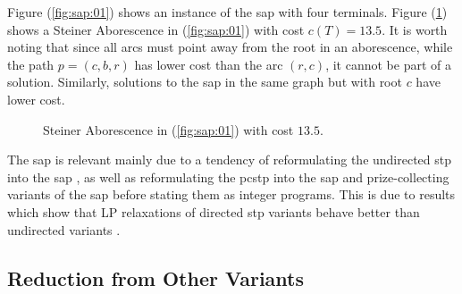 Figure (\ref{fig:sap:01}) shows an instance of the \gls{sap} with four terminals. Figure (\ref{fig:sap:01:opt}) shows a Steiner Aborescence in (\ref{fig:sap:01})
with cost $c(T) = 13.5$. It is worth noting that since all arcs must point away from the root in an aborescence, while the path $p = (c, b, r)$  has
 lower cost than the arc $(r, c)$, it cannot be part of a solution. Similarly, solutions to the \gls{sap} in the same graph but with root $c$ have lower cost.

\begin{figure}[h]\centering
{}
\caption{Steiner Aborescence in (\ref{fig:sap:01}) with cost $13.5$.}
\label{fig:sap:01:opt}
\end{figure}

The \gls{sap} is relevant mainly due to a tendency of reformulating the undirected \gls{stp} into the \gls{sap} \citep{koch1998solving}, as well as reformulating
the \gls{pcstp} into the \gls{sap} \citep{gamrath2017scip, Ljubic:2004:memetic} and
prize-collecting variants of the \gls{sap} \citep{leitner2016dual, ljubic2005solving} before stating them as integer programs. This is due to results which show that LP relaxations of
 directed \gls{stp} variants behave better than undirected variants \citep{Chopra:1994}.

\subsection{Reduction from Other Variants}

